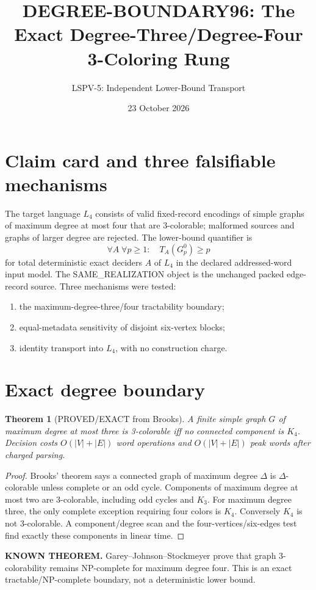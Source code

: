 \documentclass[11pt]{article}
\title{DEGREE-BOUNDARY96: The Exact Degree-Three/Degree-Four 3-Coloring Rung}
\author{LSPV-5: Independent Lower-Bound Transport}
\date{23 October 2026}
\newtheorem{theorem}{Theorem}
\begin{document}
\maketitle
\begin{center}
\end{center}

\section{Claim card and three falsifiable mechanisms}
The target language \(L_4\) consists of valid fixed-record encodings of simple
graphs of maximum degree at most four that are 3-colorable; malformed sources
and graphs of larger degree are rejected. The lower-bound quantifier is
\[
 \forall A\;\forall p\ge1:\quad T_A(G_p^0)\ge p
\]
for total deterministic exact deciders \(A\) of \(L_4\) in the declared
addressed-word input model. The SAME\_REALIZATION object is the unchanged
packed edge-record source. Three mechanisms were tested:
\begin{enumerate}
\item the maximum-degree-three/four tractability boundary;
\item equal-metadata sensitivity of disjoint six-vertex blocks;
\item identity transport into \(L_4\), with no construction charge.
\end{enumerate}

\section{Exact degree boundary}
\begin{theorem}[PROVED/EXACT from Brooks]
A finite simple graph \(G\) of maximum degree at most three is 3-colorable
iff no connected component is \(K_4\). Decision costs \(O(|V|+|E|)\) word
operations and \(O(|V|+|E|)\) peak words after charged parsing.
\end{theorem}
\begin{proof}
Brooks' theorem says a connected graph of maximum degree \(\Delta\) is
\(\Delta\)-colorable unless complete or an odd cycle. Components of maximum
degree at most two are 3-colorable, including odd cycles and \(K_3\). For
maximum degree three, the only complete exception requiring four colors is
\(K_4\). Conversely \(K_4\) is not 3-colorable. A component/degree scan and
the four-vertices/six-edges test find exactly these components in linear time.
\end{proof}
\textbf{KNOWN THEOREM.} Garey--Johnson--Stockmeyer prove that graph
3-colorability remains NP-complete for maximum degree four. This is an exact
tractable/NP-complete boundary, not a deterministic lower bound.
\end{document}
